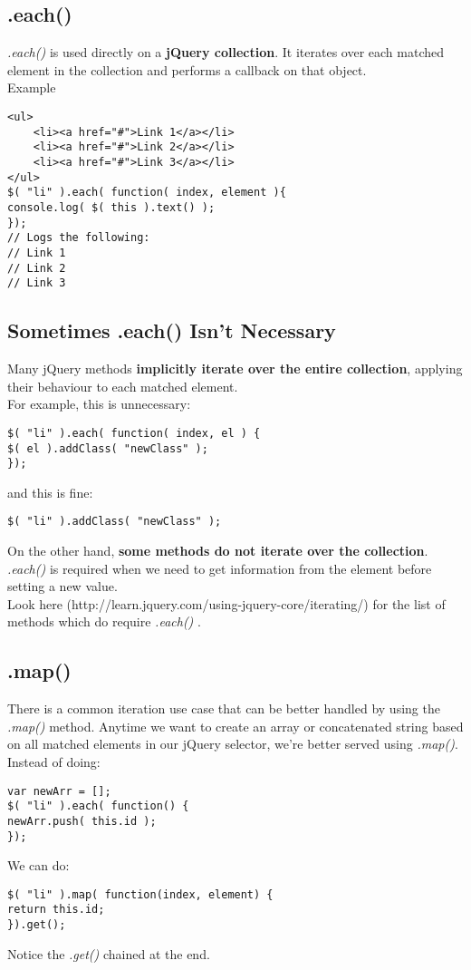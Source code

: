 \documentclass[10pt,letterpaper]{book}
\begin{document}
\subsection{.each()}
\textit{.each()} is used directly on a \textbf{jQuery collection}. It iterates over each matched element in the collection and performs a callback on that object.\\
Example
\begin{lstlisting}
<ul>
	<li><a href="#">Link 1</a></li>
	<li><a href="#">Link 2</a></li>
	<li><a href="#">Link 3</a></li>
</ul>
$( "li" ).each( function( index, element ){
console.log( $( this ).text() );
});
// Logs the following:
// Link 1
// Link 2
// Link 3
\end{lstlisting}
\subsection{Sometimes .each() Isn't Necessary}
Many jQuery methods \textbf{implicitly iterate over the entire collection}, applying their behaviour to each matched element.\\
For example, this is unnecessary:
\begin{lstlisting}
$( "li" ).each( function( index, el ) {
$( el ).addClass( "newClass" );
});
\end{lstlisting}
and this is fine:
\begin{lstlisting}
$( "li" ).addClass( "newClass" );
\end{lstlisting}
On the other hand, \textbf{some methods do not iterate over the collection}. \textit{.each()} is required when we need to get information from the element before setting a new value.\\
Look here (http://learn.jquery.com/using-jquery-core/iterating/) for the list of methods which do require \textit{.each()} .
\subsection{.map()}
There is a common iteration use case that can be better handled by using the \textit{.map()} method. Anytime we want to create an array or concatenated string based on all matched elements in our jQuery selector, we're better served using \textit{.map()}.\\
Instead of doing:
\begin{lstlisting}
var newArr = [];
$( "li" ).each( function() {
newArr.push( this.id );
});
\end{lstlisting}
We can do:
\begin{lstlisting}
$( "li" ).map( function(index, element) {
return this.id;
}).get();
\end{lstlisting}
Notice the \textit{.get()} chained at the end.
\end{document}
